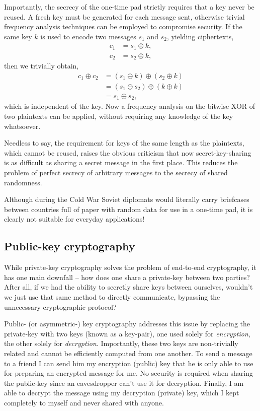 Importantly, the secrecy of the one-time pad strictly requires that a key never be reused. A fresh key must be generated for each message sent, otherwise trivial frequency analysis techniques can be employed to compromise security. If the same key $k$ is used to encode two messages $s_1$ and $s_2$, yielding ciphertexts,
\begin{align}
c_1&=s_1\oplus k,\nonumber\\
c_2&=s_2\oplus k,
\end{align}
then we trivially obtain,
\begin{align}
c_1 \oplus c_2 &= (s_1 \oplus k) \oplus (s_2 \oplus k) \nonumber \\
&= (s_1 \oplus s_2) \oplus (k \oplus k) \nonumber \\
&= s_1 \oplus s_2,
\end{align}
which is independent of the key. Now a frequency analysis on the bitwise XOR of two plaintexts can be applied, without requiring any knowledge of the key whatsoever.

Needless to say, the requirement for keys of the same length as the plaintexts, which cannot be reused, raises the obvious criticism that now secret-key-sharing is as difficult as sharing a secret message in the first place. This reduces the problem of perfect secrecy of arbitrary messages to the secrecy of shared randomness. 

Although during the Cold War Soviet diplomats would literally carry briefcases between countries full of paper with random data for use in a one-time pad, it is clearly not suitable for everyday applications!

%
%

\subsection{Public-key cryptography}\label{sec:public_key_crypt}

While private-key cryptography solves the problem of end-to-end cryptography, it has one main downfall -- how does one share a private-key between two parties? After all, if we had the ability to secretly share keys between ourselves, wouldn't we just use that same method to directly communicate, bypassing the unnecessary cryptographic protocol?

Public- (or asymmetric-) key cryptography addresses this issue by replacing the private-key with two keys (known as a key-pair), one used solely for \textit{encryption}, the other solely for \textit{decryption}. Importantly, these two keys are non-trivially related and cannot be efficiently computed from one another. To send a message to a friend I can send him my encryption (public) key that he is only able to use for preparing an encrypted message for me. No security is required when sharing the public-key since an eavesdropper can't use it for decryption. Finally, I am able to decrypt the message using my decryption (private) key, which I kept completely to myself and never shared with anyone.

